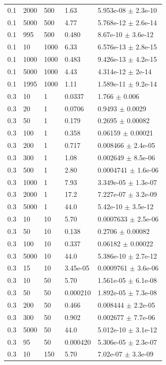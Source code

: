 \begin{longtable}{lllll}
	0.1 & 2000 & 500 & 1.63 & 5.953e-08 $\pm$ 2.3e-10 \\
	0.1 & 5000 & 500 & 4.77 & 5.768e-12 $\pm$ 2.6e-14 \\
	0.1 & 995 & 500 & 0.480 & 8.67e-10 $\pm$ 3.6e-12 \\
	0.1 & 10 & 1000 & 6.33 & 6.576e-13 $\pm$ 2.8e-15 \\
	0.1 & 1000 & 1000 & 0.483 & 9.426e-13 $\pm$ 4.2e-15 \\
	0.1 & 5000 & 1000 & 4.43 & 4.314e-12 $\pm$ 2e-14 \\
	0.1 & 1995 & 1000 & 1.11 & 1.589e-11 $\pm$ 9.2e-14 \\
	0.3 & 10 & 1 & 0.0337 & 1.766 $\pm$ 0.006 \\
	0.3 & 20 & 1 & 0.0706 & 0.9493 $\pm$ 0.0029 \\
	0.3 & 50 & 1 & 0.179 & 0.2695 $\pm$ 0.00082 \\
	0.3 & 100 & 1 & 0.358 & 0.06159 $\pm$ 0.00021 \\
	0.3 & 200 & 1 & 0.717 & 0.008466 $\pm$ 2.4e-05 \\
	0.3 & 300 & 1 & 1.08 & 0.002649 $\pm$ 8.5e-06 \\
	0.3 & 500 & 1 & 2.80 & 0.0004741 $\pm$ 1.6e-06 \\
	0.3 & 1000 & 1 & 7.93 & 3.349e-05 $\pm$ 1.3e-07 \\
	0.3 & 2000 & 1 & 17.2 & 7.227e-07 $\pm$ 3.2e-09 \\
	0.3 & 5000 & 1 & 44.0 & 5.42e-10 $\pm$ 3.5e-12 \\
	0.3 & 10 & 10 & 5.70 & 0.0007633 $\pm$ 2.5e-06 \\
	0.3 & 50 & 10 & 0.138 & 0.2706 $\pm$ 0.00082 \\
	0.3 & 100 & 10 & 0.337 & 0.06182 $\pm$ 0.00022 \\
	0.3 & 5000 & 10 & 44.0 & 5.386e-10 $\pm$ 2.7e-12 \\
	0.3 & 15 & 10 & 3.45e-05 & 0.0009761 $\pm$ 3.6e-06 \\
	0.3 & 10 & 50 & 5.70 & 1.561e-05 $\pm$ 6.1e-08 \\
	0.3 & 50 & 50 & 0.000210 & 1.892e-05 $\pm$ 7.3e-08 \\
	0.3 & 200 & 50 & 0.466 & 0.008444 $\pm$ 2.2e-05 \\
	0.3 & 300 & 50 & 0.902 & 0.002677 $\pm$ 7.7e-06 \\
	0.3 & 5000 & 50 & 44.0 & 5.012e-10 $\pm$ 3.1e-12 \\
	0.3 & 95 & 50 & 0.000420 & 5.306e-05 $\pm$ 2.3e-07 \\
	0.3 & 10 & 150 & 5.70 & 7.02e-07 $\pm$ 3.3e-09 \\

\end{longtable}

